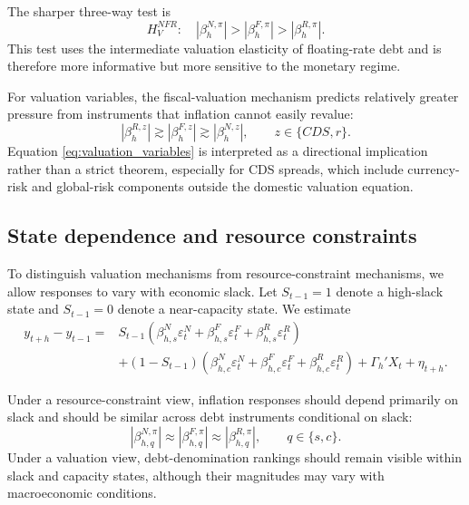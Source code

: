 \documentclass[12pt,a4paper]{article}
\begin{document}
The sharper three-way test is
\begin{equation}
H_{V}^{NFR}:\quad |\beta_h^{N,\pi}|>|\beta_h^{F,\pi}|>|\beta_h^{R,\pi}|.
\label{eq:test_nfr}
\end{equation}
This test uses the intermediate valuation elasticity of floating-rate debt and is therefore more informative but more sensitive to the monetary regime.

For valuation variables, the fiscal-valuation mechanism predicts relatively greater pressure from instruments that inflation cannot easily revalue:
\begin{equation}
|\beta_h^{R,z}|\gtrsim |\beta_h^{F,z}|\gtrsim |\beta_h^{N,z}|,
\qquad
z\in\{CDS,r\}.
\label{eq:valuation_variables}
\end{equation}
Equation \eqref{eq:valuation_variables} is interpreted as a directional implication rather than a strict theorem, especially for CDS spreads, which include currency-risk and global-risk components outside the domestic valuation equation.

\subsection{State dependence and resource constraints}

To distinguish valuation mechanisms from resource-constraint mechanisms, we allow responses to vary with economic slack. Let \(S_{t-1}=1\) denote a high-slack state and \(S_{t-1}=0\) denote a near-capacity state. We estimate
\begin{align}
y_{t+h}-y_{t-1}
=&
S_{t-1}
\left(
\beta_{h,s}^{N}\varepsilon_t^N
+
\beta_{h,s}^{F}\varepsilon_t^F
+
\beta_{h,s}^{R}\varepsilon_t^R
\right)
\nonumber\\
&+
(1-S_{t-1})
\left(
\beta_{h,c}^{N}\varepsilon_t^N
+
\beta_{h,c}^{F}\varepsilon_t^F
+
\beta_{h,c}^{R}\varepsilon_t^R
\right)
+
\Gamma_h'X_t
+\eta_{t+h}.
\label{eq:lp_state}
\end{align}

Under a resource-constraint view, inflation responses should depend primarily on slack and should be similar across debt instruments conditional on slack:
\begin{equation}
|\beta_{h,q}^{N,\pi}|
\approx
|\beta_{h,q}^{F,\pi}|
\approx
|\beta_{h,q}^{R,\pi}|,
\qquad
q\in\{s,c\}.
\end{equation}
Under a valuation view, debt-denomination rankings should remain visible within slack and capacity states, although their magnitudes may vary with macroeconomic conditions.
\end{document}
